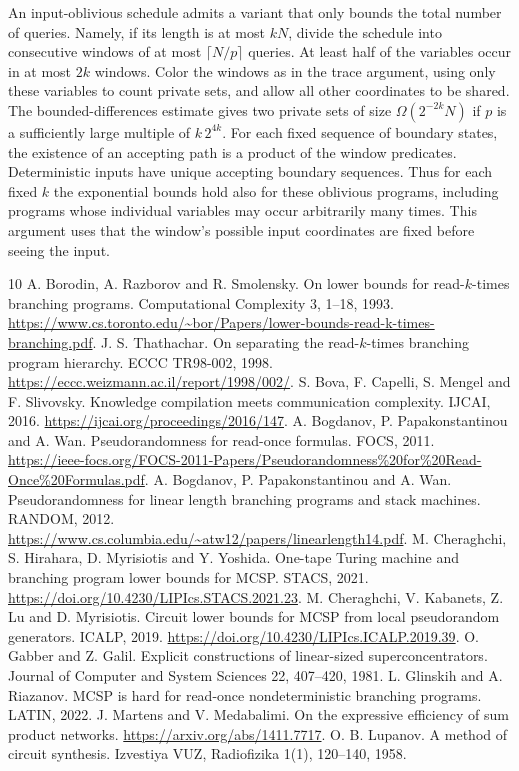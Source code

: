 \documentclass[11pt]{article}
\begin{document}
An input-oblivious schedule admits a variant that only bounds the total number of queries. Namely, if its length is at most $kN$, divide the schedule into consecutive windows of at most $\lceil N/p\rceil$ queries. At least half of the variables occur in at most $2k$ windows. Color the windows as in the trace argument, using only these variables to count private sets, and allow all other coordinates to be shared. The bounded-differences estimate gives two private sets of size $\Omega(2^{-2k}N)$ if $p$ is a sufficiently large multiple of $k\, 2^{4k}$. For each fixed sequence of boundary states, the existence of an accepting path is a product of the window predicates. Deterministic inputs have unique accepting boundary sequences. Thus for each fixed $k$ the exponential bounds hold also for these oblivious programs, including programs whose individual variables may occur arbitrarily many times. This argument uses that the window's possible input coordinates are fixed before seeing the input.
\begin{thebibliography}{10}
 A. Borodin, A. Razborov and R. Smolensky.
On lower bounds for read-$k$-times branching programs.
Computational Complexity 3, 1--18, 1993.
\url{https://www.cs.toronto.edu/~bor/Papers/lower-bounds-read-k-times-branching.pdf}.
 J. S. Thathachar.
On separating the read-$k$-times branching program hierarchy.
ECCC TR98-002, 1998.
\url{https://eccc.weizmann.ac.il/report/1998/002/}.
 S. Bova, F. Capelli, S. Mengel and F. Slivovsky.
Knowledge compilation meets communication complexity. IJCAI, 2016.
\url{https://ijcai.org/proceedings/2016/147}.
 A. Bogdanov, P. Papakonstantinou and A. Wan.
Pseudorandomness for read-once formulas. FOCS, 2011.
\url{https://ieee-focs.org/FOCS-2011-Papers/Pseudorandomness%20for%20Read-Once%20Formulas.pdf}.
 A. Bogdanov, P. Papakonstantinou and A. Wan.
Pseudorandomness for linear length branching programs and stack machines.
RANDOM, 2012. \url{https://www.cs.columbia.edu/~atw12/papers/linearlength14.pdf}.
 M. Cheraghchi, S. Hirahara, D. Myrisiotis and Y. Yoshida.
One-tape Turing machine and branching program lower bounds for MCSP. STACS, 2021.
\url{https://doi.org/10.4230/LIPIcs.STACS.2021.23}.
 M. Cheraghchi, V. Kabanets, Z. Lu and D. Myrisiotis.
Circuit lower bounds for MCSP from local pseudorandom generators. ICALP, 2019.
\url{https://doi.org/10.4230/LIPIcs.ICALP.2019.39}.
 O. Gabber and Z. Galil.
Explicit constructions of linear-sized superconcentrators.
Journal of Computer and System Sciences 22, 407--420, 1981.
 L. Glinskih and A. Riazanov.
MCSP is hard for read-once nondeterministic branching programs. LATIN, 2022.
 J. Martens and V. Medabalimi.
On the expressive efficiency of sum product networks.
\url{https://arxiv.org/abs/1411.7717}.
 O. B. Lupanov.
A method of circuit synthesis. Izvestiya VUZ, Radiofizika 1(1), 120--140, 1958.
\end{thebibliography}
\end{document}
